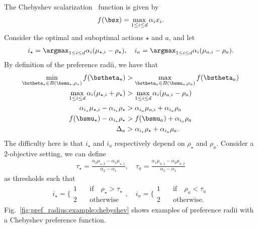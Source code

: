 \begin{example}[Chebyshev]
\label{ex:chebyshev}
    The Chebyshev scalarization~\cite{Bowman1976} function is given by
    \begin{align*}
        f(\bsx) = \max_{1 \leq i \leq d} \alpha_i x_i.
    \end{align*}
    Consider the optimal and suboptimal actions $\star$ and $a$, and let
    \begin{align*}
        i_\star = \argmax_{1 \leq i \leq d} \alpha_i (\mu_{\star, i} - \rho_\star), \quad
        i_a = \argmax_{1 \leq i \leq d} \alpha_i (\mu_{a, i} - \rho_a).
    \end{align*}
    By definition of the preference radii, we have that
    \begin{align*}
        \min_{\bstheta_\star \in B(\bsmu_\star, \rho_\star)} f(\bstheta_\star) & > \max_{\bstheta_a \in B(\bsmu_a, \rho_a)} f(\bstheta_a) \\
        \max_{1 \leq i \leq d} \alpha_i (\mu_{\star, i} + \rho_\star) & > \max_{1\leq i \leq d} \alpha_i (\mu_{a, i} - \rho_a) \\
        \alpha_{i_\star} \mu_{\star, i} - \alpha_{i_\star} \rho_\star & > \alpha_{i_a} \mu_{a, i} + \alpha_{i_a} \rho_a  \\
        f(\bsmu_\star) - \alpha_{i_\star} \rho_\star &> f(\bsmu_a) + \alpha_{i_a} \rho_a \\
        \Delta_a &> \alpha_{i_\star} \rho_\star + \alpha_{i_a} \rho_a.
    \end{align*}
    The difficulty here is that $i_\star$ and $i_a$ respectively depend on $\rho_\star$ and $\rho_a$. Consider a 2-objective setting, we can define
    \begin{align*}
        \tau_\star = \frac{\alpha_2 \mu_{\star, 2} - \alpha_1 \mu_{\star, 1}}{\alpha_2 - \alpha_1}, \quad
        \tau_a = \frac{\alpha_1 \mu_{a, 1} - \alpha_2 \mu_{a, 2}}{\alpha_2 - \alpha_1}
    \end{align*}
    as thresholds such that
    \begin{align*}
        i_\star = \bigg\{
            \begin{array}{ll}
            1 & \quad \text{if} \quad \rho_\star > \tau_\star \\
            2 & \quad \text{otherwise}
            \end{array}, \quad
        i_a = \bigg\{
            \begin{array}{ll}
            1 & \quad \text{if} \quad \rho_a < \tau_a \\
            2 & \quad \text{otherwise}.
            \end{array}
    \end{align*}
    Fig.~\ref{fig:pref_radius:example:chebyshev} shows examples of preference radii with a Chebyshev preference function. 
\end{example}

